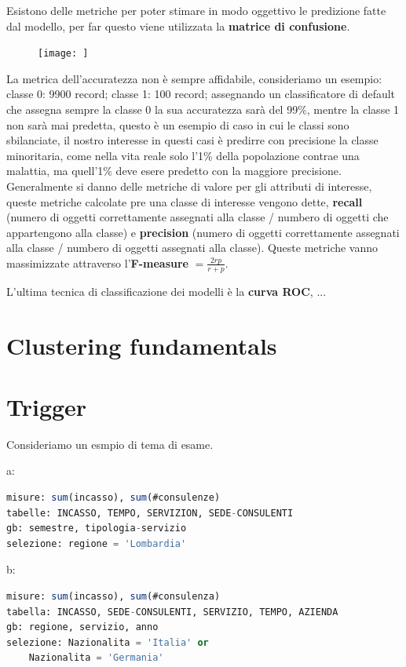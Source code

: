 \documentclass[12pt]{article}
\begin{document}
Esistono delle metriche per poter stimare in modo oggettivo le predizione fatte dal modello, per far questo viene utilizzata la \textbf{matrice di confusione}.
\begin{figure}[H]
    \centering
    \texttt{[image: ]}
    \caption{}
    \label{fig:}
\end{figure}
La metrica  dell'accuratezza non \`e sempre affidabile, consideriamo un esempio: classe 0: 9900 record; classe 1: 100 record; assegnando un classificatore di default che assegna sempre la classe 0 la sua accuratezza sar\`a del 99\%, mentre la classe 1 non sar\`a mai predetta, questo \`e un esempio di caso in cui le classi sono sbilanciate, il nostro interesse in questi casi \`e predirre con precisione la classe minoritaria, come nella vita reale solo l'1\% della popolazione contrae una malattia, ma quell'1\% deve esere predetto con la maggiore precisione. Generalmente si danno delle metriche di valore per gli attributi di interesse, queste metriche calcolate pre una classe di interesse vengono dette, \textbf{recall} (numero di oggetti correttamente assegnati alla classe / numbero di oggetti che appartengono alla classe) e \textbf{precision} (numero di oggetti correttamente assegnati alla classe / numbero di oggetti assegnati alla classe). Queste metriche vanno massimizzate attraverso l'\textbf{F-measure} $= \frac{2rp}{r + p} $.

L'ultima tecnica di classificazione dei modelli \`e la \textbf{curva ROC}, ...



\section{Clustering fundamentals}







\newpage
\section{Trigger}
Consideriamo un esmpio di tema di esame.

a:
\begin{lstlisting}[language=sql]
misure: sum(incasso), sum(#consulenze)
tabelle: INCASSO, TEMPO, SERVIZION, SEDE-CONSULENTI
gb: semestre, tipologia-servizio
selezione: regione = 'Lombardia'
\end{lstlisting}

b:
\begin{lstlisting}[language=sql]
misure: sum(incasso), sum(#consulenza)
tabella: INCASSO, SEDE-CONSULENTI, SERVIZIO, TEMPO, AZIENDA
gb: regione, servizio, anno
selezione: Nazionalita = 'Italia' or
    Nazionalita = 'Germania'
\end{lstlisting}
\end{document}
